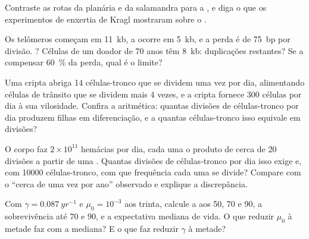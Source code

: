 \begin{exercise}[$\star$]\label{exo:b3:stem-cells:4}
Contraste as rotas da planária e da salamandra para a , e diga
o que os experimentos de enxertia de Kragl mostraram sobre o .
\end{exercise}

\begin{exercise}[$\star\star$]\label{exo:b3:stem-cells:5}
Os telômeros começam em \qty{11}{kb}, a  ocorre em
\qty{5}{kb}, e a perda é de \qty{75}{bp} por divisão. ?
Células de um doador de 70 anos têm \qty{8}{kb}: duplicações restantes?
Se a  compensar \qty{60}{\%} da perda, qual é o limite?
\end{exercise}

\begin{exercise}[$\star\star$]\label{exo:b3:stem-cells:6}
Uma cripta abriga 14 células-tronco que se dividem uma vez por dia,
alimentando células de trânsito que se dividem mais 4 vezes, e a cripta
fornece \num{300} células por dia à sua vilosidade. Confira a aritmética:
quantas divisões de células-tronco por dia produzem filhas em
diferenciação, e a quantas células-tronco isso equivale em divisões?
\end{exercise}

\begin{exercise}[$\star\star$]\label{exo:b3:stem-cells:7}
O corpo faz $2\times 10^{11}$ hemácias por dia, cada uma o produto de
cerca de 20 divisões a partir de uma . Quantas divisões de
células-tronco por dia isso exige e, com \num{10000} células-tronco, com
que frequência cada uma se divide? Compare com o ``cerca de uma vez por
ano'' observado e explique a discrepância.
\end{exercise}

\begin{exercise}[$\star\star$]\label{exo:b3:stem-cells:8}
Com $\gamma = \qty{0.087}{yr^{-1}}$ e $\mu_{0} = 10^{-3}$ aos trinta,
calcule a  aos 50, 70 e 90, a sobrevivência até 70 e
90, e a expectativa mediana de vida. O que reduzir $\mu_{0}$ à metade faz
com a mediana? E o que faz reduzir $\gamma$ à metade?
\end{exercise}

